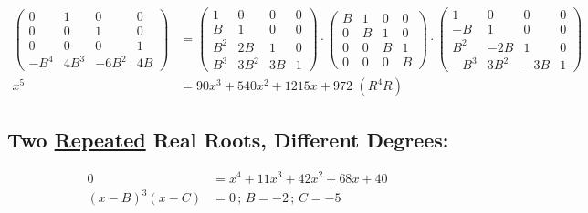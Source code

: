 \documentclass[12pt,a4paper]{article}
\begin{document}
\begin{align}
\left( \begin{matrix} 0 & 1 & 0 & 0 \\ 0 & 0 & 1 & 0 \\ 0 & 0 & 0 & 1 \\ -B^4 & 4B^3 & -6B^2 & 4B \end{matrix} \right)
&=
\left( \begin{matrix}  1 & 0 & 0 & 0 \\ B & 1 & 0 & 0 \\ B^2 & 2B & 1 & 0 \\ B^3 & 3B^2 & 3B & 1  \end{matrix} \right) \cdot
\left( \begin{matrix}  B & 1 & 0 & 0 \\ 0 & B & 1 & 0 \\ 0 & 0 & B & 1 \\ 0 & 0 & 0 & B  \end{matrix} \right) \cdot
\left( \begin{matrix}  1 & 0 & 0 & 0 \\ -B & 1 & 0 & 0 \\ B^2 & -2B & 1 & 0 \\ -B^3 & 3B^2 & -3B & 1  \end{matrix} \right)  \\
x^5 &= 90x^3 + 540 x^2 + 1215 x + 972\,\,(R^4R)
\end{align}

\subsection{Two \href{}{Repeated} Real Roots, Different Degrees:}

\begin{align}
0 &= x^4 + 11 x^3 + 42 x^2 + 68 x + 40 \\
(x - B)^3 (x - C) &= 0\,;\,B = -2\,;\,C = -5
\end{align}
\end{document}
